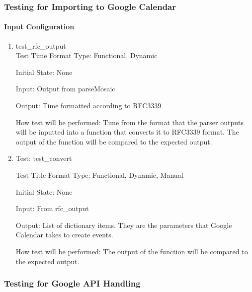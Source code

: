 \documentclass[12pt, titlepage]{article}
\begin{document}
\subsubsection{Testing for Importing to Google Calendar}

\paragraph{Input Configuration}

\begin{enumerate}

\item{\color{blue}test\_rfc\_output}\\
\color{black}
Test Time Format
Type: Functional, Dynamic
					
Initial State: None
					
Input: Output from parseMosaic 
					
Output: Time formatted according to RFC3339
					
How test will be performed: 
Time from the format that the parser outputs will be inputted into a function that converts it to RFC3339 format. The output of the function will be compared to the expected output. 

\color{blue}\item{Test: test\_convert}

Test Title Format
Type: Functional, Dynamic, Manual
					
Initial State: None
					
Input: From rfc\_output
					
Output: List of dictionary items. They are the parameters that Google Calendar takes to create events. 
					
How test will be performed: 
The output of the function will be compared to the expected output.
\color{black}
\end{enumerate}


\subsubsection{Testing for Google API Handling}
\end{document}
